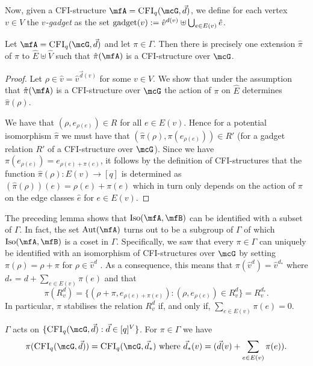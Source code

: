 \documentclass[a4paper,UKenglish]{lipics}
\newcommand{\defeq}{:=}
\newcommand{\inseg}[1]{\ensuremath{[#1]}}
\newcommand{\Aut}{\ensuremath{\text{Aut}}\xspace}
\newcommand{\Iso}{\ensuremath{\text{Iso}}\xspace}
\newcommand{\vct}[1]{\vec{#1}}
\theoremstyle{plain}
\begin{document}
Now, given a CFI-structure $\mfA = \CFI(\mcG,\vec d)$, we define for 
each vertex $v \in V$ the \emph{$v$-gadget} as the set $\gadget(v) \defeq \hat 
v^{d(v)} \uplus \bigcup_{e \in E(v)} \hat e$.

\begin{lemma}
Let $\mfA = \CFI(\mcG,\vec d)$ and let $\pi \in 
\Gamma$. 
Then there is precisely one extension $\hat \pi$ of $\pi$
to $\hat E \uplus \hat V$ such that $\hat \pi (\mfA)$ is a CFI-structure 
over $\mcG$.
\end{lemma}
\begin{proof}
 Let $\rho \in \hat v = \hat v^{\vct d(v)}$ for some $v\in V$. We show that 
under 
the 
assumption that $\hat \pi(\mfA)$ is a CFI-structure over $\mcG$ the 
action of $\pi$ on $\hat{E}$ determines $\hat \pi ( \rho )$.

We have that $(\rho, e_{\rho(e)}) \in R$ for all $e \in E(v)$. Hence for a 
potential isomorphism $\hat \pi$ we must have that 
$(\hat \pi (\rho), \pi( e_{\rho(e)} )) \in R'$ (for a gadget relation 
$R'$ of a CFI-structure over $\mcG$). 
Since we have $\pi( e_{\rho(e)}) = e_{\rho(e) + \pi(e)}$, it follows by the 
definition of CFI-structures that the function $\hat 
\pi(\rho) : E(v) \to \inseg q$ is determined as
$(\hat \pi(\rho))(e) = \rho(e) + \pi(e)$ which in turn only depends on the 
action of $\pi$ on the edge classes $\hat{e}$ for $e \in E(v)$.
\end{proof}


\smallskip
The preceding lemma shows that $\Iso(\mfA,\mfB)$ can be identified with 
a subset of $\Gamma$. In fact, the set 
$\Aut(\mfA)$ turns out to be a subgroup of $\Gamma$ of which $\Iso(\mfA,\mfB)$ 
is a coset in $\Gamma$.
Specifically, we saw that every $\pi \in \Gamma$ can uniquely be 
identified with an isomorphism of CFI-structures over $\mcG$ by setting
$\pi(\rho) = \rho + \pi$ for $\rho \in \hat v^{d}$ . As a consequence, 
this 
means that $\pi(\hat v^d) = \hat v^{d_*}$ where $d_* = d + \sum_{e \in 
E(v)} \pi(e)$ and that 
\[ \pi(R_v^{d}) = \{ (\rho + \pi, e_{\rho(e) + \pi(e)} ) : (\rho, 
e_{\rho(e)}) \in R_v^d\} = R^{d_*}_v.\]
In particular, $\pi$ stabilises the relation $R_v^{d}$ if, 
and only if, $\sum_{e \in E(v)} \pi(e) = 0$.

\begin{lemma}\label{lemma:action:on:cfi}
$\Gamma$ acts on $\{ \CFI(\mcG,\vec d) : \vec d \in \inseg q^V  
\}$. For $\pi \in \Gamma$ we have  
\[ \pi( \CFI(\mcG,\vec d) ) = \CFI(\mcG,\vec d_*) \text{ where } 
\vec d_*(v) = (\vec d(v) + \sum_{e \in E(v)}  \pi(e)).\]
\end{lemma}
\end{document}
